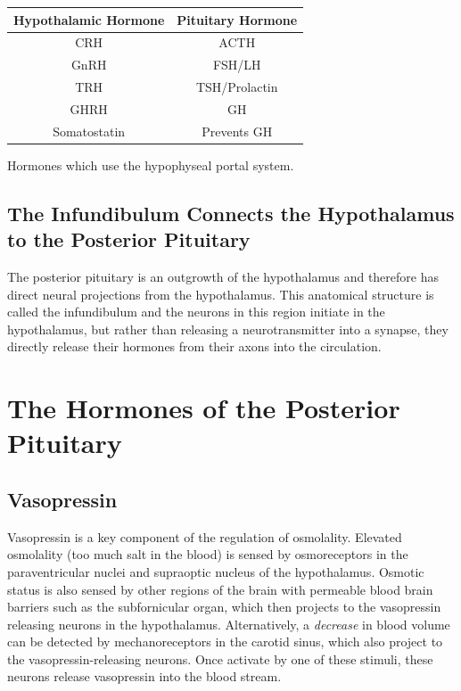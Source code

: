 \documentclass{tufte-handout}
\begin{document}
\begin{margintable}
  \centering
  \begin{tabular}{cc}
    \toprule
    Hypothalamic Hormone & Pituitary Hormone \\
    \midrule
    CRH & ACTH \\
    GnRH & FSH/LH\\
    TRH & TSH/Prolactin \\
    GHRH & GH \\
    Somatostatin & Prevents GH \\
    \bottomrule
  \end{tabular}
  \caption{Hormones which use the hypophyseal portal system.}
  \label{tab:anterior-pituitary-hormones}
\end{margintable}


\subsection{The Infundibulum Connects the Hypothalamus to the Posterior Pituitary}

The posterior pituitary is an outgrowth of the hypothalamus and therefore has direct neural projections from the hypothalamus.  This anatomical structure is called the infundibulum and the neurons in this region initiate in the hypothalamus, but rather than releasing a neurotransmitter into a synapse, they directly release their hormones from their axons into the circulation.

\section{The Hormones of the Posterior Pituitary}

\subsection{Vasopressin}

Vasopressin is a key component of the regulation of osmolality.  Elevated osmolality (too much salt in the blood) is sensed by osmoreceptors in the  paraventricular nuclei  and supraoptic nucleus of the hypothalamus.  Osmotic status is also sensed by other regions of the brain with permeable blood brain barriers such as the subfornicular organ, which then projects to the vasopressin releasing neurons in the hypothalamus.  Alternatively, a \emph{decrease} in blood volume can be detected by mechanoreceptors in the carotid sinus, which also project to the vasopressin-releasing neurons.  Once activate by one of these stimuli, these neurons release vasopressin into the blood stream.
\end{document}
